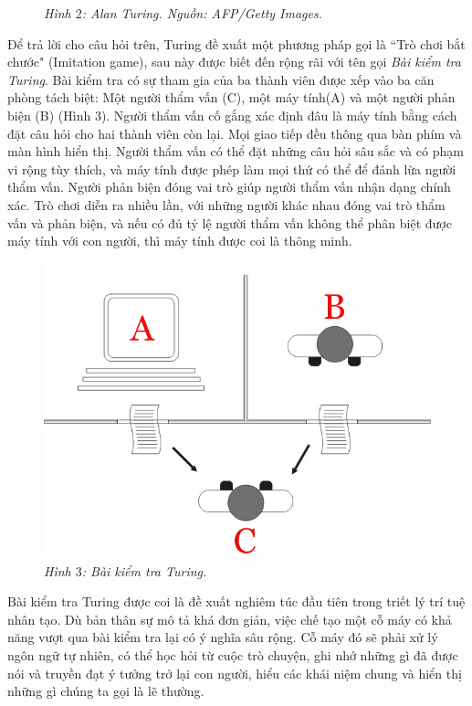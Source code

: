 \begin{multicols}{2}
\begin{figure}[H]
		\caption{\small\textit{\color{cackithi}Hình $2$: Alan Turing. Nguồn: AFP/Getty Images.}}
		\vspace*{-10pt}
	\end{figure}
	Để trả lời cho câu hỏi trên, Turing đề xuất một phương pháp gọi là ``Trò chơi bắt chước" (Imitation game), sau này được biết đến rộng rãi với tên gọi \textit{Bài kiểm tra Turing}. Bài kiểm tra có sự tham gia của ba thành viên được xếp vào ba căn phòng tách biệt: Một người thẩm vấn (C), một máy tính(A) và một người phản biện (B) (Hình $3$). Người thẩm vấn cố gắng xác định đâu là máy tính bằng cách đặt câu hỏi cho hai thành viên còn lại. Mọi giao tiếp đều thông qua bàn phím và màn hình hiển thị. Người thẩm vấn có thể đặt những câu hỏi sâu sắc và có phạm vi rộng tùy thích, và máy tính được phép làm mọi thứ có thể để đánh lừa người thẩm vấn. Người phản biện đóng vai trò giúp người thẩm vấn nhận dạng chính xác. Trò chơi diễn ra nhiều lần, với những người khác nhau đóng vai trò thẩm vấn và phản biện, và nếu có đủ tỷ lệ người thẩm vấn không thể phân biệt được máy tính với con người, thì máy tính được coi là thông minh.
	\begin{figure}[H]
		\vspace*{-5pt}
		\centering
		\captionsetup{labelformat= empty, justification=centering}
		\includegraphics[width= 1\linewidth]{Turing_test}
		\caption{\small\textit{\color{cackithi}Hình $3$: Bài kiểm tra Turing.}}
		\vspace*{-10pt}
	\end{figure}
	Bài kiểm tra Turing được coi là đề xuất nghiêm túc đầu tiên trong triết lý trí tuệ nhân tạo. Dù bản thân sự mô tả khá đơn giản, việc chế tạo một cỗ máy có khả năng vượt qua bài kiểm tra lại có ý nghĩa sâu rộng. Cỗ máy đó sẽ phải xử lý ngôn ngữ tự nhiên, có thể học hỏi từ cuộc trò chuyện, ghi nhớ những gì đã được nói và truyền đạt ý tưởng trở lại con người, hiểu các khái niệm chung và hiển thị những gì chúng ta gọi là lẽ thường. 

\end{multicols}

